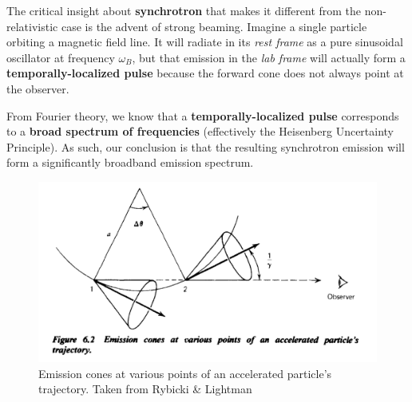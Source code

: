 The critical insight about \textbf{synchrotron} that makes it different from the non-relativistic case is the advent of strong beaming. Imagine a single particle orbiting a magnetic field line. It will radiate in its \textit{rest frame} as a pure sinusoidal oscillator at frequency $\omega_{B}$, but that emission in the \textit{lab frame} will actually form a \textbf{temporally-localized pulse} because the forward cone does not always point at the observer.

From Fourier theory, we know that a \textbf{temporally-localized pulse} corresponds to a \textbf{broad spectrum of frequencies} (effectively the Heisenberg Uncertainty Principle). As such, our conclusion is that the resulting synchrotron emission will form a significantly broadband emission spectrum.
\begin{figure}[h!]
    \centering
    \includegraphics[width=0.75\linewidth]{Pictures/figures/rybicki_lightman_6_2.png}
    \caption{Emission cones at various points of an accelerated particle's trajectory. Taken from Rybicki \& Lightman}
    \label{fig:synchrotron_emission_cone}
\end{figure}

